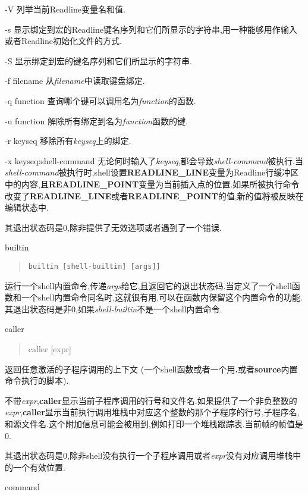 \documentclass[draft,openany]{book}
\begin{document}
\begin{CJK}{UTF8}{gbsn}
\begin{basedescript}{\desclabelstyle{\nextlinelabel}\desclabelwidth{2.5em}}
\begin{basedescript}{\desclabelstyle{\nextlinelabel}\desclabelwidth{2.5em}}
        \item[-V] 列举当前Readline变量名和值.
        \item[-s] 显示绑定到宏的Readline键名序列和它们所显示的字符串,用一种能够用作输入或者Readline初始化文件的方式.
        \item[-S] 显示绑定到宏的键名序列和它们所显示的字符串.
        \item[-f filename] 从\emph{filename}中读取键盘绑定.
        \item[-q function] 查询哪个键可以调用名为\emph{function}的函数.
        \item[-u function] 解除所有绑定到名为\emph{function}函数的键.
        \item[-r keyseq] 移除所有\emph{keyseq}上的绑定.
        \item[-x keyseq:shell-command] 无论何时输入了\emph{keyseq},都会导致\emph{shell-command}被执行.当\emph{shell-command}被执行时,shell设置\textbf{READLINE\_LINE}变量为Readline行缓冲区中的内容,且\textbf{READLINE\_POINT}变量为当前插入点的位置.如果所被执行命令改变了\textbf{READLINE\_LINE}或者\textbf{READLINE\_POINT}的值,新的值将被反映在编辑状态中.
        \end{basedescript}
        其退出状态码是0,除非提供了无效选项或者遇到了一个错误.
    \item[builtin]
        \begin{quote}
        \verb+builtin [shell-builtin] [args]]+
        \end{quote}
        运行一个shell内置命令,传递\emph{args}给它,且返回它的退出状态码.当定义了一个shell函数和一个shell内置命令同名时,这就很有用,可以在函数内保留这个内置命令的功能.其退出状态码是非0,如果\emph{shell-builtin}不是一个shell内置命令.
    \item[caller]
        \begin{quote}
            caller [expr]
        \end{quote}
        返回任意激活的子程序调用的上下文 (一个shell函数或者一个用\textbf{.}或者\textbf{source}内置命令执行的脚本).\par
        不带\emph{expr},\textbf{caller}显示当前子程序调用的行号和文件名.如果提供了一个非负整数的\emph{expr},\textbf{caller}显示当前执行调用堆栈中对应这个整数的那个子程序的行号,子程序名,和源文件名.这个附加信息可能会被用到,例如打印一个堆栈跟踪表.当前帧的帧值是0.\par
        其退出状态码是0,除非shell没有执行一个子程序调用或者\emph{expr}没有对应调用堆栈中的一个有效位置.
    \item[command]
        \begin{quote}

\end{quote}
\end{basedescript}
\end{CJK}
\end{document}
